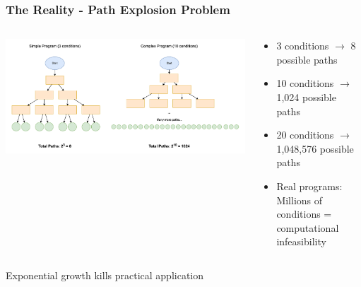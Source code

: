 \documentclass[aspectratio=169]{beamer}
\begin{document}
\begin{frame}
    \frametitle{The Reality - Path Explosion Problem}
    \begin{columns}
        \begin{column}{0.6\textwidth}
            \includegraphics[width=\textwidth]{./pic/path_explosion_problem.pdf}
        \end{column}
        \begin{column}{0.4\textwidth}
            \begin{itemize}
                \item 3 conditions $\to$ 8 possible paths
                \item 10 conditions $\to$ 1,024 possible paths  
                \item 20 conditions $\to$ 1,048,576 possible paths
                \item \alert{Real programs:} Millions of conditions = computational infeasibility
            \end{itemize}
        \end{column}
    \end{columns}
    
    \vspace{1em}
    \begin{center}
        \large\alert{Exponential growth kills practical application}
    \end{center}
\end{frame}
\end{document}
